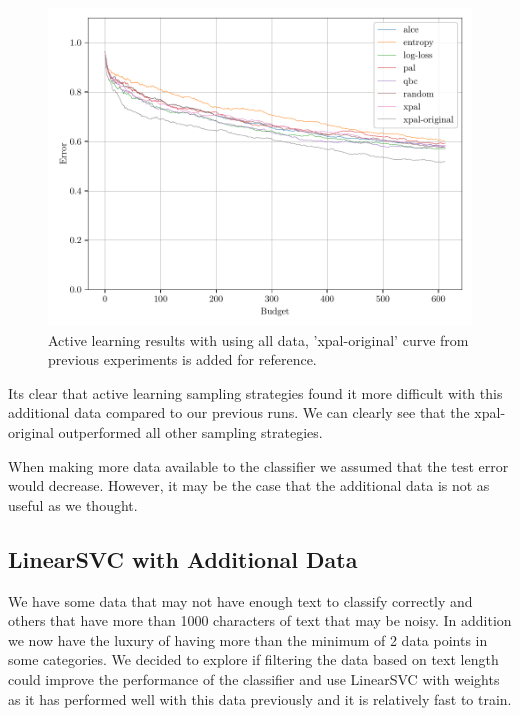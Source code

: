 \begin{figure}[ht]
  \centering
  \includegraphics[width=\scale\textwidth]{../img/plot_all_data_new_vectorizer_test_results.pdf}
  \caption{Active learning results with using all data, 'xpal-original' curve from previous experiments is added for reference.}
  \label{fig:active_learning_new_data_new_vect}
\end{figure}

Its clear that active learning sampling strategies found it more difficult with this additional data compared to our previous runs. We can clearly see that the xpal-original outperformed all other sampling strategies.

When making more data available to the classifier we assumed that the test error would decrease. However, it may be the case that the additional data is not as useful as we thought.

\subsection{LinearSVC with Additional Data}

We have some data that may not have enough text to classify correctly and others that have more than 1000 characters of text that may be noisy. In addition we now have the luxury of having more than the minimum of 2 data points in some categories. We decided to explore if filtering the data based on text length could improve the performance of the classifier and use LinearSVC with weights as it has performed well with this data previously and it is relatively fast to train.

